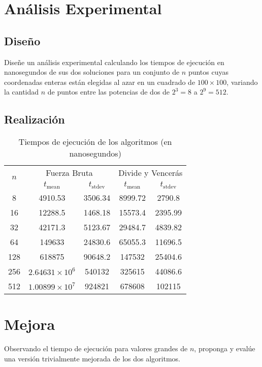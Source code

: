 \documentclass{article}
\begin{document}
\section{Análisis Experimental}

\subsection{Diseño}

Diseñe un análisis experimental calculando los tiempos de ejecución en nanosegundos de sus dos soluciones para un conjunto de $n$ puntos cuyas coordenadas enteras están elegidas al azar en un cuadrado de $100\times100$, variando la cantidad $n$ de puntos entre las potencias de dos de $2^3=8$ a $2^{9}=512$.

\subsection{Realización}
\begin{table}[H]
\centering
\caption{Tiempos de ejecución de los algoritmos (en nanosegundos)}
\begin{tabular}{ccccc}
\toprule
\multirow{2}{*}{$n$} & \multicolumn{2}{c}{Fuerza Bruta} & \multicolumn{2}{c}{Divide y Vencerás} \\
\cmidrule(lr){2-3} \cmidrule(lr){4-5}
& $t_{\text{mean}}$ & $t_{\text{stdev}}$ & $t_{\text{mean}}$ & $t_{\text{stdev}}$ \\
\midrule
8 & 4910.53 & 3506.34 & 8999.72 & 2790.8 \\
16 & 12288.5 & 1468.18 & 15573.4 & 2395.99 \\
32 & 42171.3 & 5123.67 & 29484.7 & 4839.82 \\
64 & 149633 & 24830.6 & 65055.3 & 11696.5 \\
128 & 618875 & 90648.2 & 147532 & 25404.6 \\
256 & $2.64631 \times 10^6$ & 540132 & 325615 & 44086.6 \\
512 & $1.00899 \times 10^7$ & 924821 & 678608 & 102115 \\
\bottomrule
\end{tabular}
\end{table}
    
\section{Mejora}
Observando el tiempo de ejecución para valores grandes de $n$, proponga y evalúe una versión trivialmente mejorada de los dos algoritmos.
\end{document}
